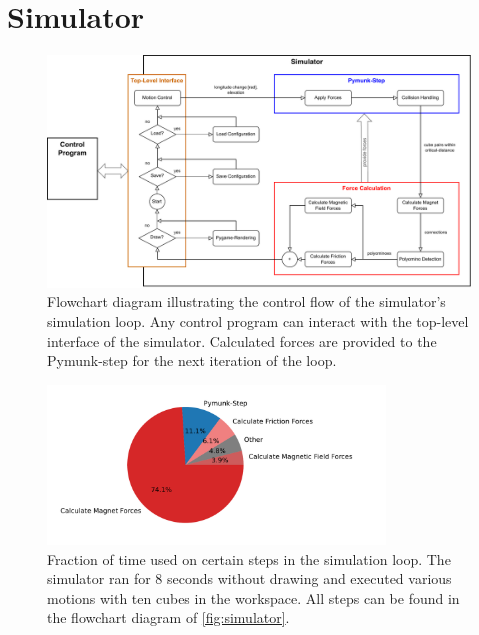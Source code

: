 \chapter{Simulator}
\label{chap:sim}

\begin{figure}
	\centering
	\includegraphics[width=1\textwidth]{figures/simulator_controlflow.pdf}
	\caption[Control flow of the simulator's simulation loop]{Flowchart diagram illustrating the control flow of the simulator's simulation loop. Any control program can interact with the top-level interface of the simulator. Calculated forces are provided to the Pymunk-step for the next iteration of the loop.}
	\label{fig:simulator}
\end{figure}

\begin{figure}
	\centering
	\includegraphics[width=0.8\textwidth]{figures/plots/simulator_timeuse.pdf}
	\caption[Time-use for certain steps in the simulation loop]{Fraction of time used on certain steps in the simulation loop. The simulator ran for $8$ seconds without drawing and executed various motions with ten cubes in the workspace. All steps can be found in the flowchart diagram of \autoref{fig:simulator}.}
	\label{fig:timeuse}
\end{figure}

